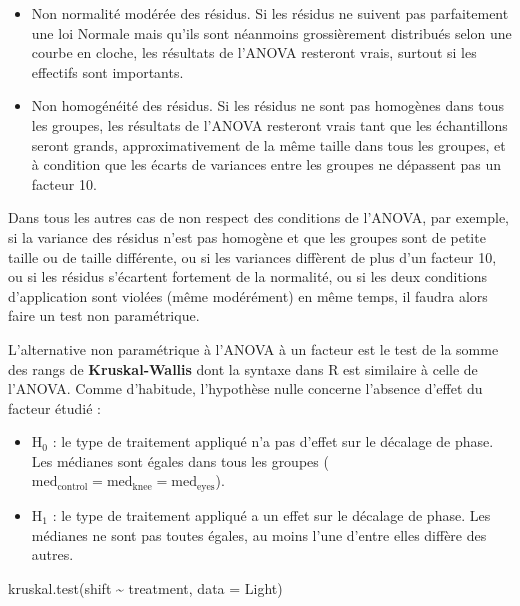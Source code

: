 \documentclass[
  a4paper,
]{article}
\newenvironment{Shaded}{\begin{snugshade}}{\end{snugshade}}
\newcommand{\AttributeTok}[1]{\textcolor[rgb]{0.00,0.34,0.68}{#1}}
\newcommand{\FunctionTok}[1]{\textcolor[rgb]{0.39,0.29,0.61}{#1}}
\newcommand{\NormalTok}[1]{\textcolor[rgb]{0.12,0.11,0.11}{#1}}
\newcommand{\SpecialCharTok}[1]{\textcolor[rgb]{0.24,0.68,0.91}{#1}}
\providecommand{\tightlist}{%
  \setlength{\itemsep}{0pt}\setlength{\parskip}{0pt}}
\begin{document}
\begin{itemize}
\tightlist
\item
  Non normalité modérée des résidus. Si les résidus ne suivent pas parfaitement une loi Normale mais qu'ils sont néanmoins grossièrement distribués selon une courbe en cloche, les résultats de l'ANOVA resteront vrais, surtout si les effectifs sont importants.
\item
  Non homogénéité des résidus. Si les résidus ne sont pas homogènes dans tous les groupes, les résultats de l'ANOVA resteront vrais tant que les échantillons seront grands, approximativement de la même taille dans tous les groupes, et à condition que les écarts de variances entre les groupes ne dépassent pas un facteur 10.
\end{itemize}

Dans tous les autres cas de non respect des conditions de l'ANOVA, par exemple, si la variance des résidus n'est pas homogène et que les groupes sont de petite taille ou de taille différente, ou si les variances diffèrent de plus d'un facteur 10, ou si les résidus s'écartent fortement de la normalité, ou si les deux conditions d'application sont violées (même modérément) en même temps, il faudra alors faire un test non paramétrique.

L'alternative non paramétrique à l'ANOVA à un facteur est le test de la somme des rangs de \textbf{Kruskal-Wallis} dont la syntaxe dans R est similaire à celle de l'ANOVA. Comme d'habitude, l'hypothèse nulle concerne l'absence d'effet du facteur étudié :

\begin{itemize}
\tightlist
\item
  H\(_0\) : le type de traitement appliqué n'a pas d'effet sur le décalage de phase. Les médianes sont égales dans tous les groupes (\(\textrm{med}_\textrm{control} = \textrm{med}_\textrm{knee} = \textrm{med}_\textrm{eyes}\)).
\item
  H\(_1\) : le type de traitement appliqué a un effet sur le décalage de phase. Les médianes ne sont pas toutes égales, au moins l'une d'entre elles diffère des autres.
\end{itemize}

\begin{Shaded}
\begin{Highlighting}[]
\FunctionTok{kruskal.test}\NormalTok{(shift }\SpecialCharTok{\textasciitilde{}}\NormalTok{ treatment, }\AttributeTok{data =}\NormalTok{ Light)}
\end{Highlighting}
\end{Shaded}
\end{document}
